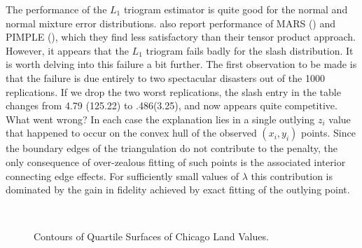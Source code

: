  
 

The performance of the $L_1$ triogram estimator is quite good for
the normal and normal mixture error distributions.  
also report performance of MARS () and PIMPLE
(), which they find less satisfactory than their
tensor product approach.  However, it appears that the $L_1$ triogram 
fails badly for the slash distribution.  It is worth delving into this
failure a bit further.  The first observation to be made is that the
failure  is due entirely to two spectacular disasters out of the 1000
replications.  If we drop the two worst replications, the slash entry
in the table changes from 4.79 (125.22) to .486(3.25), and now appears
quite competitive.  What went wrong?
In each case the explanation lies in a single outlying $z_i$ value that happened
to occur on the convex hull of the observed $(x_i,y_i)$ points.  Since the 
boundary edges of the triangulation do not contribute to the penalty, the
only consequence of over-zealous fitting of such points is the associated
interior connecting edge effects.  
For sufficiently small values of $\lambda$
this contribution is dominated by the gain in fidelity achieved by exact 
fitting of the outlying point.  

\begin{figure}[ht]
\label{f:quantiles}
\renewcommand\thesubfigure{}
\begin{center}
\mbox{\qquad
        \qquad
        }
\end{center}
\caption{Contours of Quartile Surfaces of Chicago Land Values.}
\end{figure}


